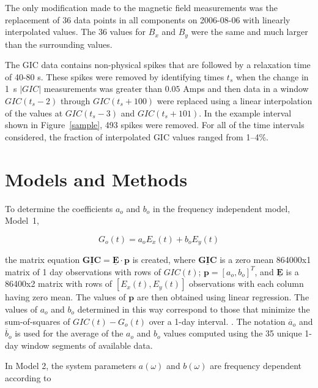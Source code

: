 \documentclass[draft,linenumbers]{agujournal2018}
\begin{document}
The only modification made to the magnetic field measurements was the replacement of 36 data points in all components on 2006-08-06 with linearly interpolated values. The 36 values for $B_x$ and $B_y$ were the same and much larger than the surrounding values.

The GIC data contains non-physical spikes that are followed by a relaxation time of 40-80 s. These spikes were removed by identifying times $t_s$ when the change in 1~s $|GIC|$ measurements was greater than $0.05$ Amps and then data in a window $GIC(t_s-2)$ through $GIC(t_s+100)$ were replaced using a linear interpolation of the values at $GIC(t_s-3)$ and $GIC(t_s + 101)$. In the example interval shown in Figure~\ref{sample}, 493 spikes were removed. For all of the time intervals considered, the fraction of interpolated GIC values ranged from 1--4\%.

\section{Models and Methods}

To determine the coefficients $a_o$ and $b_o$ in the frequency independent model, Model~1,

\begin{linenomath*}
\begin{equation}
G_o(t) = a_oE_x(t) + b_oE_y(t)
\label{model1}
\end{equation}
\end{linenomath*}

\noindent
the matrix equation $\underline{\mathbf{GIC}} = \underline{\mathbf{E}}\cdot\mathbf{p}$ is created, where $\underline{\mathbf{GIC}}$ is a zero mean 864000x1 matrix of 1 day observations with rows of $GIC(t)$; $\mathbf{p} = [a_o,b_o]^T$, and $\underline{\mathbf{E}}$ is a 86400x2 matrix with rows of $[E_x(t), E_y(t)]$ observations with each column having zero mean. The values of $\mathbf{p}$ are then obtained using linear regression. The values of $a_o$ and $b_o$ determined in this way correspond to those that minimize the sum-of-squares of $GIC(t)-G_o(t)$ over a 1-day interval. \citep[][provided the mathematically equivalent closed-form equations.]{Pulkkinen2007}. The notation $\overline{a}_o$ and $\overline{b}_o$ is used for the average of the $a_o$ and $b_o$ values computed using the 35 unique 1-day window segments of available data.

In Model 2, the system parameters $a(\omega)$ and $b(\omega)$ are frequency dependent according to
\end{document}
